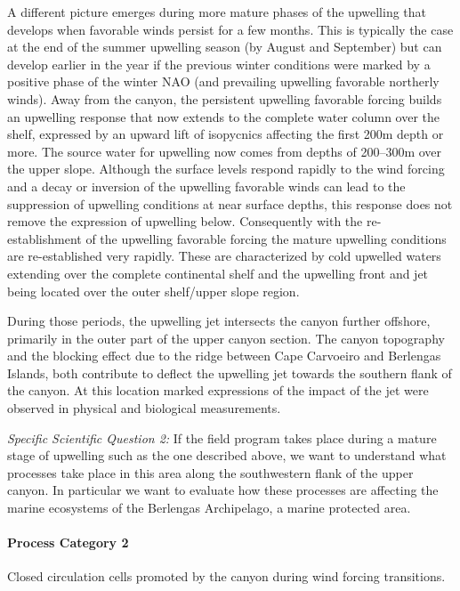  
A different picture emerges during more mature phases of the upwelling
that develops when favorable winds persist for a few months. This is
typically the case at the end of the summer upwelling season (by
August and September) but can develop earlier in the year if the
previous winter conditions were marked by a positive phase of the
winter NAO (and prevailing upwelling favorable northerly winds). Away
from the canyon, the persistent upwelling favorable forcing builds an
upwelling response that now extends to the complete water column over
the shelf, expressed by an upward lift of isopycnics affecting the
first 200m depth or more. The source water for upwelling now comes
from depths of 200--300m over the upper slope. Although the surface
levels respond rapidly to the wind forcing and a decay or inversion of
the upwelling favorable winds can lead to the suppression of upwelling
conditions at near surface depths, this response does not remove the
expression of upwelling below. Consequently with the re-establishment
of the upwelling favorable forcing the mature upwelling conditions are
re-established very rapidly. These are characterized by cold upwelled
waters extending over the complete continental shelf and the upwelling
front and jet being located over the outer shelf/upper slope region.

During those periods, the upwelling jet intersects the \naz canyon
further offshore, primarily in the outer part of the upper canyon
section. The canyon topography and the blocking effect due to the
ridge between Cape Carvoeiro and Berlengas Islands, both contribute to
deflect the upwelling jet towards the southern flank of the canyon. At
this location marked expressions of the impact of the jet were
observed in physical and biological measurements.

 
\textsl{Specific Scientific Question 2:} If the \proj field program
takes place during a mature stage of upwelling such as the one
described above, we want to understand what processes take place in
this area along the southwestern flank of the upper \naz canyon. In
particular we want to evaluate how these processes are affecting the
marine ecosystems of the Berlengas Archipelago, a marine protected
area.

\par

\paragraph{Process Category 2} Closed circulation cells promoted by
the canyon during wind forcing transitions.

